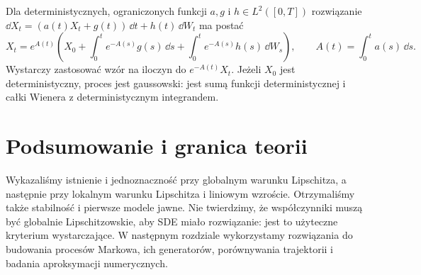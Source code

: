 \begin{przyklad}
Dla deterministycznych, ograniczonych funkcji $a,g$
i $h\in L^2([0,T])$ rozwiązanie
$\dd X_t=(a(t)X_t+g(t))\,\dd t+h(t)\,\dd W_t$
ma postać
\[
X_t=e^{A(t)}\left(X_0+\int_0^te^{-A(s)}g(s)\,\dd s
+\int_0^te^{-A(s)}h(s)\,\dd W_s\right),
\qquad A(t)=\int_0^t a(s)\,\dd s.
\]
Wystarczy zastosować wzór na iloczyn do
$e^{-A(t)}X_t$. Jeżeli $X_0$ jest deterministyczny,
proces jest gaussowski: jest sumą funkcji deterministycznej
i całki Wienera z deterministycznym integrandem.
\end{przyklad}

\section{Podsumowanie i granica teorii}
Wykazaliśmy istnienie i jednoznaczność przy globalnym
warunku Lipschitza, a następnie przy lokalnym warunku
Lipschitza i liniowym wzroście. Otrzymaliśmy także
stabilność i pierwsze modele jawne. Nie twierdzimy,
że współczynniki muszą być globalnie Lipschitzowskie,
aby SDE miało rozwiązanie: jest to użyteczne kryterium
wystarczające. W następnym rozdziale wykorzystamy
rozwiązania do budowania procesów Markowa, ich generatorów,
porównywania trajektorii i badania aproksymacji numerycznych.
